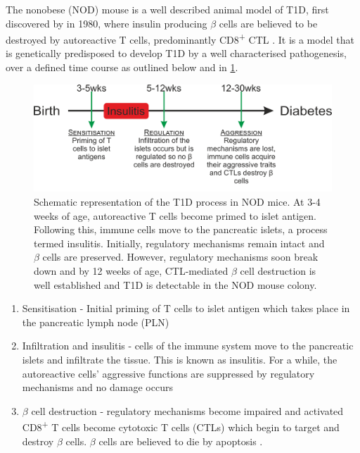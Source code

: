 The nonobese (NOD) mouse is a well described animal model of T1D, first discovered by \citet{Makino1980} in 1980, where insulin producing $\beta$ cells are believed to be destroyed by autoreactive T cells, predominantly CD8\textsuperscript{+} CTL \citep{Lieberman2003}.
It is a model that is genetically predisposed to develop T1D by a well characterised pathogenesis, over a defined time course as outlined below and in \cref{fig:diseasecourse}.

\begin{figure}
\includegraphics[width=\textwidth]{Figures/NODdisease.png}
\caption[Schematic representation of the T1D process in NOD mice]{Schematic representation of the T1D process in NOD mice. At 3-4 weeks of age, autoreactive T cells become primed to islet antigen. Following this, immune cells move to the pancreatic islets, a process termed insulitis. Initially, regulatory mechanisms remain intact and $\beta$ cells are preserved. However, regulatory mechanisms soon break down and by 12 weeks of age, CTL-mediated $\beta$ cell destruction is well established and T1D is detectable in the NOD mouse colony.}
\label{fig:diseasecourse}
\end{figure}

\begin{enumerate}
\item Sensitisation - Initial priming of T cells to islet antigen which takes place in the pancreatic lymph node (PLN)
\item Infiltration and insulitis - cells of the immune system move to the pancreatic islets and infiltrate the tissue. This is known as insulitis. For a while, the autoreactive cells' aggressive functions are suppressed by regulatory mechanisms and no damage occurs
\item $\beta$ cell destruction - regulatory mechanisms become impaired and activated CD8\textsuperscript{+} T cells become cytotoxic T cells (CTLs) which begin to target and destroy $\beta$ cells. $\beta$ cells are believed to die by apoptosis \citep{Cnop2005}.
\end{enumerate}


